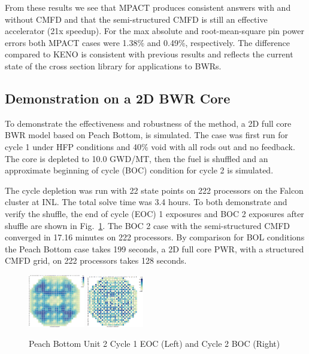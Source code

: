 \documentclass{anstrans}
\newcommand{\figref}[1]{Fig.~\ref{#1}}
\begin{document}
From these results we see that MPACT produces consistent answers with and without CMFD and that the semi-structured CMFD is still an effective accelerator (21x speedup). For the max absolute and root-mean-square pin power errors both MPACT cases were 1.38\% and 0.49\%, respectively. The difference compared to KENO is consistent with previous results \cite{Kochunas2017} and reflects the current state of the cross section library for applications to BWRs.

\subsection{Demonstration on a 2D BWR Core}
To demonstrate the effectiveness and robustness of the method, a 2D full core BWR model based on Peach Bottom, is simulated. The case was first run for cycle 1 under HFP conditions and 40\% void with all rods out and no feedback. The core is depleted to 10.0 GWD/MT, then the fuel is shuffled and an approximate beginning of cycle (BOC) condition for cycle 2 is simulated.

The cycle depletion was run with 22 state points on 222 processors on the Falcon cluster at INL. The total solve time was 3.4 hours. To both demonstrate and verify the shuffle, the end of cycle (EOC) 1 exposures and BOC 2 exposures after shuffle are shown in \figref{fig:pb_shuffle}. The BOC 2 case with the semi-structured CMFD converged in 17.16 minutes on 222 processors. By comparison for BOL conditions the Peach Bottom case takes 199 seconds, a 2D full core PWR, with a structured CMFD grid, on 222 processors takes 128 seconds.

\begin{figure}[!ht]
    \centering
    \includegraphics[width=0.22\textwidth]{pin_exposures_PB_Cycle1_2D_EOC.png}
    \includegraphics[width=0.22\textwidth]{pin_exposures_PB_Cycle2_2D_BOC.png}
    \caption{Peach Bottom Unit 2 Cycle 1 EOC (Left) and Cycle 2 BOC (Right)}
    \label{fig:pb_shuffle}
\end{figure}
\end{document}
